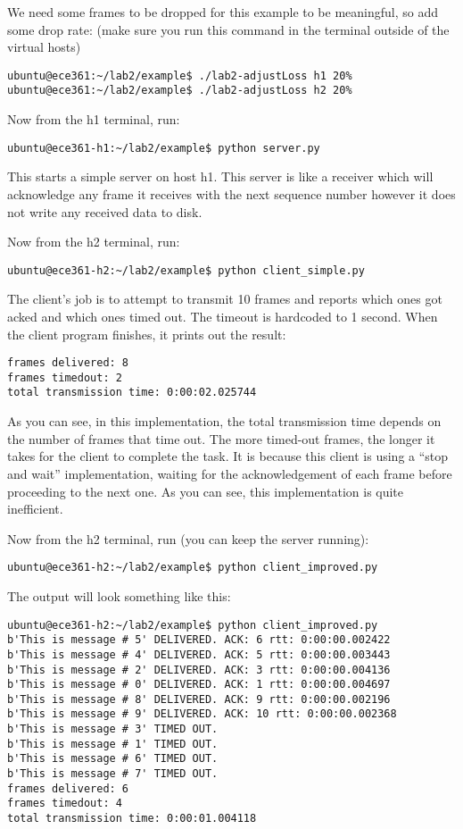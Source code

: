 \documentclass[11pt]{article}
\begin{document}
We need some frames to be dropped for this example to be meaningful, so add some drop rate: (make sure you run this command in the terminal outside of the virtual hosts)
\begin{lstlisting}[style=ece361shell]
ubuntu@ece361:~/lab2/example$ ./lab2-adjustLoss h1 20%
ubuntu@ece361:~/lab2/example$ ./lab2-adjustLoss h2 20%
\end{lstlisting}

Now from the h1 terminal, run:
\begin{lstlisting}[style=ece361shell, caption={}]
ubuntu@ece361-h1:~/lab2/example$ python server.py
\end{lstlisting}

This starts a simple server on host h1. This server is like a receiver which will acknowledge any frame it receives with the next sequence number however it does not write any received data to disk.

Now from the h2 terminal, run:
\begin{lstlisting}[style=ece361shell, caption={}]
ubuntu@ece361-h2:~/lab2/example$ python client_simple.py
\end{lstlisting}

The client's job is to attempt to transmit 10 frames and reports which ones got acked and which ones timed out. The timeout is hardcoded to 1 second. When the client program finishes, it prints out the result:
\begin{lstlisting}[style=ece361shell, caption={}]
frames delivered: 8
frames timedout: 2
total transmission time: 0:00:02.025744
\end{lstlisting}
As you can see, in this implementation, the total transmission time depends on the number of frames that time out. The more timed-out frames, the longer it takes for the client to complete the task. It is because this client is using a ``stop and wait'' implementation, waiting for the acknowledgement of each frame before proceeding to the next one. As you can see, this implementation is quite inefficient.

Now from the h2 terminal, run (you can keep the server running):
\begin{lstlisting}[style=ece361shell, caption={}]
ubuntu@ece361-h2:~/lab2/example$ python client_improved.py
\end{lstlisting}

The output will look something like this:
\begin{lstlisting}[style=ece361shell, caption={}]
ubuntu@ece361-h2:~/lab2/example$ python client_improved.py
b'This is message # 5' DELIVERED. ACK: 6 rtt: 0:00:00.002422
b'This is message # 4' DELIVERED. ACK: 5 rtt: 0:00:00.003443
b'This is message # 2' DELIVERED. ACK: 3 rtt: 0:00:00.004136
b'This is message # 0' DELIVERED. ACK: 1 rtt: 0:00:00.004697
b'This is message # 8' DELIVERED. ACK: 9 rtt: 0:00:00.002196
b'This is message # 9' DELIVERED. ACK: 10 rtt: 0:00:00.002368
b'This is message # 3' TIMED OUT.
b'This is message # 1' TIMED OUT.
b'This is message # 6' TIMED OUT.
b'This is message # 7' TIMED OUT.
frames delivered: 6
frames timedout: 4
total transmission time: 0:00:01.004118
\end{lstlisting}
\end{document}
